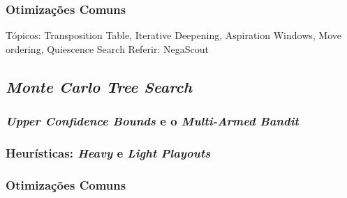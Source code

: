 \documentclass[12pt,a4paper,oneside]{article}
\begin{document}
\lipsum[1]

\lipsum[2]

\lipsum[3]

\lipsum[4]

\lipsum[5]

\lipsum[6]

\subsubsection{Otimizações Comuns}


Tópicos: Transposition Table, Iterative Deepening, Aspiration Windows, Move ordering, Quiescence Search
Referir: NegaScout

\lipsum[1]

\lipsum[2]

\lipsum[3]

\lipsum[4]

\lipsum[5]

\subsection{\textit{Monte Carlo Tree Search}}

\lipsum[1]

\lipsum[2]

\lipsum[3]

\subsubsection{\textit{Upper Confidence Bounds} e o \textit{Multi-Armed Bandit}}

\lipsum[1]

\lipsum[2]

\subsubsection{Heurísticas: \textit{Heavy} e \textit{Light} \textit{Playouts}}

\lipsum[1]

\lipsum[2]

\subsubsection{Otimizações Comuns}

\end{document}
